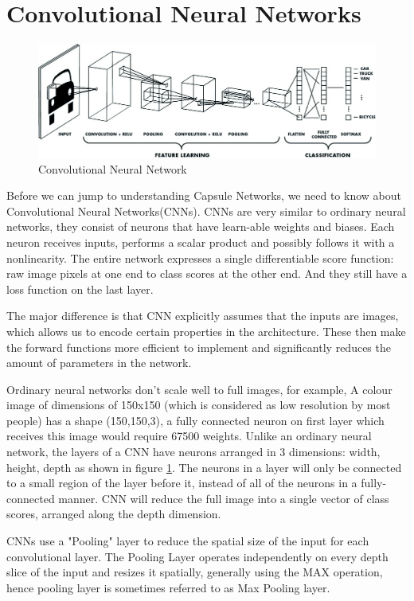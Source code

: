 \section{Convolutional Neural Networks} %
\label{sec:convolutional_neural_networks}

\begin{figure}[H]
\centering\includegraphics[width=.7\textwidth]{images/CNN.jpg}
\caption{Convolutional Neural Network}
\label{fig:cnn}
\end{figure}
Before we can jump to understanding Capsule Networks, we need to know about Convolutional Neural Networks(CNNs). CNNs are very similar to ordinary neural networks, they consist of neurons that have learn-able weights and biases. Each neuron receives inputs, performs a scalar product and possibly follows it with a nonlinearity. The entire network expresses a single differentiable score function: raw image pixels at one end to class scores at the other end. And they still have a loss function on the last layer.\par\bigskip
The major difference is that CNN explicitly assumes that the inputs are images, which allows us to encode certain properties in the architecture. These then make the forward functions more efficient to implement and significantly reduces the amount of parameters in the network.\par\bigskip
Ordinary neural networks don’t scale well to full images, for example, A colour image of dimensions of 150x150 (which is considered as low resolution by most people) has a shape (150,150,3), a fully connected neuron on first layer which receives this image would require 67500 weights. Unlike an ordinary neural network, the layers of a CNN have neurons arranged in 3 dimensions: width, height, depth as shown in figure \ref{fig:cnn}. The neurons in a layer will only be connected to a small region of the layer before it, instead of all of the neurons in a fully-connected manner. CNN  will reduce the full image into a single vector of class scores, arranged along the depth dimension.\par\bigskip
CNNs use a "Pooling" layer to reduce the spatial size of the input for each convolutional layer. The Pooling Layer operates independently on every depth slice of the input and resizes it spatially, generally using the MAX operation, hence pooling layer is sometimes referred to as Max Pooling layer.

